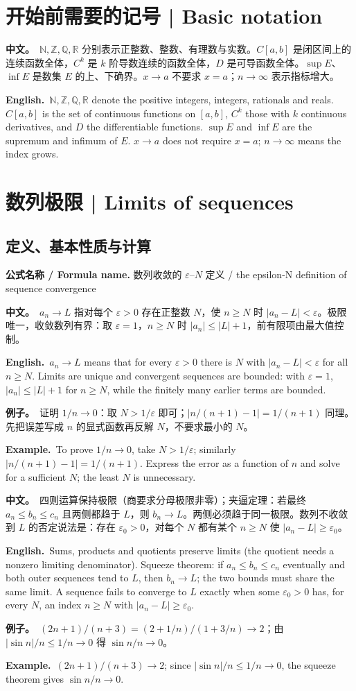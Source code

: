 \documentclass[UTF8,11pt,a4paper]{ctexart}
\newcommand{\R}{\mathbb{R}}
\newcommand{\N}{\mathbb{N}}
\newcommand{\Z}{\mathbb{Z}}
\newcommand{\Q}{\mathbb{Q}}
\newcommand{\BOTH}[2]{\par\noindent\textbf{中文。}\ #1\par\noindent\textbf{English.}\ #2\par}
\newcommand{\EX}[2]{\par\noindent\textbf{例子。}\ #1\par\noindent\textbf{Example.}\ #2\par}
\newcommand{\FORMULA}[2]{\par\noindent\textbf{公式名称 / Formula name.} #1 / #2\par}
\begin{document}
\section*{开始前需要的记号 | Basic notation}
\BOTH{$\N,\Z,\Q,\R$ 分别表示正整数、整数、有理数与实数。$C[a,b]$ 是闭区间上的连续函数全体，$C^k$ 是 $k$ 阶导数连续的函数全体，$D$ 是可导函数全体。$\sup E$、$\inf E$ 是数集 $E$ 的上、下确界。$x\to a$ 不要求 $x=a$；$n\to\infty$ 表示指标增大。}{$\N,\Z,\Q,\R$ denote the positive integers, integers, rationals and reals. $C[a,b]$ is the set of continuous functions on $[a,b]$, $C^k$ those with $k$ continuous derivatives, and $D$ the differentiable functions. $\sup E$ and $\inf E$ are the supremum and infimum of $E$. $x\to a$ does not require $x=a$; $n\to\infty$ means the index grows.}

\setcounter{section}{1}
\section{数列极限 | Limits of sequences}
\subsection{定义、基本性质与计算}
\FORMULA{数列收敛的 $\varepsilon$--$N$ 定义}{the epsilon-N definition of sequence convergence}
\BOTH{$a_n\to L$ 指对每个 $\varepsilon>0$ 存在正整数 $N$，使 $n\ge N$ 时 $|a_n-L|<\varepsilon$。极限唯一，收敛数列有界：取 $\varepsilon=1$，$n\ge N$ 时 $|a_n|\le|L|+1$，前有限项由最大值控制。}{$a_n\to L$ means that for every $\varepsilon>0$ there is $N$ with $|a_n-L|<\varepsilon$ for all $n\ge N$. Limits are unique and convergent sequences are bounded: with $\varepsilon=1$, $|a_n|\le|L|+1$ for $n\ge N$, while the finitely many earlier terms are bounded.}
\EX{证明 $1/n\to0$：取 $N>1/\varepsilon$ 即可；$|n/(n+1)-1|=1/(n+1)$ 同理。先把误差写成 $n$ 的显式函数再反解 $N$，不要求最小的 $N$。}{To prove $1/n\to0$, take $N>1/\varepsilon$; similarly $|n/(n+1)-1|=1/(n+1)$. Express the error as a function of $n$ and solve for a sufficient $N$; the least $N$ is unnecessary.}
\BOTH{四则运算保持极限（商要求分母极限非零）；夹逼定理：若最终 $a_n\le b_n\le c_n$ 且两侧都趋于 $L$，则 $b_n\to L$。两侧必须趋于同一极限。数列不收敛到 $L$ 的否定说法是：存在 $\varepsilon_0>0$，对每个 $N$ 都有某个 $n\ge N$ 使 $|a_n-L|\ge\varepsilon_0$。}{Sums, products and quotients preserve limits (the quotient needs a nonzero limiting denominator). Squeeze theorem: if $a_n\le b_n\le c_n$ eventually and both outer sequences tend to $L$, then $b_n\to L$; the two bounds must share the same limit. A sequence fails to converge to $L$ exactly when some $\varepsilon_0>0$ has, for every $N$, an index $n\ge N$ with $|a_n-L|\ge\varepsilon_0$.}
\EX{$(2n+1)/(n+3)=(2+1/n)/(1+3/n)\to2$；由 $|\sin n|/n\le1/n\to0$ 得 $\sin n/n\to0$。}{$(2n+1)/(n+3)\to2$; since $|\sin n|/n\le1/n\to0$, the squeeze theorem gives $\sin n/n\to0$.}
\end{document}
